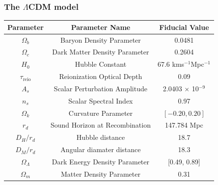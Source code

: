 \documentclass{beamer}
\begin{document}
\begin{frame}[allowframebreaks]
\frametitle{The $\Lambda$CDM model}
\begin{table}[t]
\begin{center}
\begin{tabular}{|c|c|c|}
\hline
\textbf{Parameter} & \textbf{Parameter} \textbf{Name} & \textbf{Fiducial} \textbf{Value} \\
\hline
$\Omega_b$ & Baryon Density Parameter & 0.0481 \\
$\Omega_c$ & Dark Matter Density Parameter & 0.2604 \\
$H_0$ & Hubble Constant & 67.6 kms$^{-1}$Mpc$ ^{-1}$ \\
$\tau_{\text{reio}}$ & Reionization Optical Depth & 0.09 \\
$A_s$ & Scalar Perturbation Amplitude & 2.0403 × 10$^{-9}$ \\
$n_s$ & Scalar Spectral Index & 0.97 \\
\hline
$\Omega_k$ & Curvature Parameter & $[-0.20, 0.20]$ \\
\hline
\hline
$r_d$ & Sound Horizon at Recombination & 147.784 Mpc \\
$D_H/r_d$ & Hubble distance & 18.7 \\
$D_M/r_d$ & Angular diamater distance& 18.3 \\
$\Omega_\Lambda$ & Dark Energy Density Parameter& [0.49, 0.89] \\
$\Omega_m$ & Matter Density Parameter & 0.31 \\
\hline
\end{tabular}
\end{center}
\label{tab:fid-values}
\end{table}
\end{frame}




\end{document}
